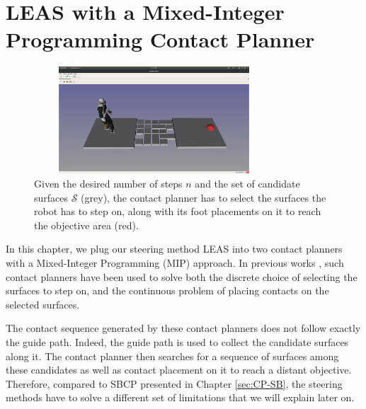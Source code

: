 

\chapter{LEAS with a Mixed-Integer Programming Contact Planner}
\label{sec:CP-SL1M}
\minitoc
\bigskip

\begin{figure}[ht]
    \centering
    \captionsetup[subfigure]{justification=centering}
    \includegraphics[trim={8cm 7cm 7.5cm 9cm},clip,width=0.8\textwidth,height=4cm]{Figures/Chapter_MIP_SL1M/rubbles/rubbles_empty.png}
    \caption{Given the desired number of steps $n$ and the set of candidate surfaces $\mathcal{S}$ (grey), the contact planner has to select the surfaces the robot has to step on, along with its foot placements on it to reach the objective area (red).\label{fig:rubbles:empty}}
\end{figure}

In this chapter, we plug our steering method LEAS into two contact planners with a Mixed-Integer Programming (MIP) approach.
In previous works \cite{deits2014FootPlanMI, sl1m_v2}, such contact planners have been used to solve both the discrete choice of selecting the surfaces to step on, and the continuous problem of placing contacts on the selected surfaces.

The contact sequence generated by these contact planners does not follow exactly the guide path.
Indeed, the guide path is used to collect the candidate surfaces along it. 
The contact planner then searches for a sequence of surfaces among these candidates as well as contact placement on it to reach a distant objective.
Therefore, compared to SBCP presented in Chapter \ref{sec:CP-SB}, the steering methods have to solve a different set of limitations that we will explain later on.


